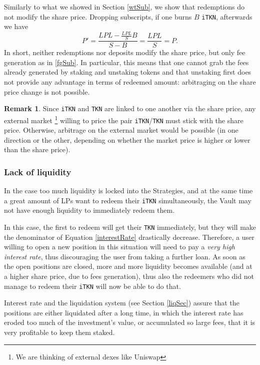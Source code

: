 \documentclass[a4paper,10 pt]{article}
\theoremstyle{definition}
\newtheorem{remark}{Remark}
\begin{document}
Similarly to what we showed in Section \ref{wtSub}, we show that redemptions do not modify the share price. Dropping subscripts, if one burns $B$ \verb|iTKN|, afterwards we have 
$$P' = \frac{LPL - \frac{LPL}{S}B}{S - B} = \frac{LPL}{S} = P.$$
In short, neither redemptions nor deposits modify the share price, but only fee generation as in \ref{fgSub}. In particular, this means that one cannot grab the fees already generated by staking and unstaking tokens and that unstaking first does not provide any advantage in terms of redeemed amount: arbitraging on the share price change is not possible.

\begin{remark}
Since \verb|iTKN| and \verb|TKN| are linked to one another via the share price, any external market \footnote{We are thinking of external dexes like Uniswap} willing to price the pair \verb|iTKN|/\verb|TKN| must stick with the share price. Otherwise, arbitrage on the external market would be possible (in one direction or the other, depending on whether the market price is higher or lower than the share price).
\end{remark}

\subsubsection{Lack of liquidity}\label{lackSubSub}
In the case too much liquidity is locked into the Strategies, and at the same time a great amount of LPs want to redeem their \verb|iTKN| simultaneously, the Vault may not have enough liquidity to immediately redeem them.

In this case, the first to redeem will get their \verb|TKN| immediately, but they will make the denominator of Equation \eqref{interestRate} drastically decrease. Therefore, a user willing to open a new position in this situation will need to pay a {\it very high interest rate}, thus discouraging the user from taking a further loan. As soon as the open positions are closed, more and more liquidity becomes available (and at a higher share price, due to fees generation), thus also the redeemers who did not manage to redeem their \verb|iTKN| will now be able to do that.

Interest rate and the liquidation system (see Section \ref{liqSec}) assure that the positions are either liquidated after a long time, in which the interest rate has eroded too much of the investment's value, or accumulated so large fees, that it is very profitable to keep them staked.
\end{document}
